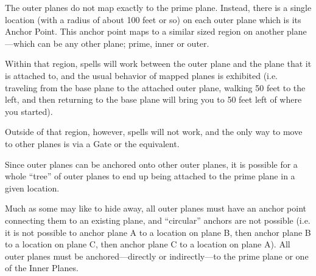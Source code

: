 \begin{multicols*}{2}
The outer planes do not map exactly to the prime plane. Instead, there is a single location (with a radius of about 100 feet or so) on each outer plane which is its Anchor Point. This anchor point maps to a similar sized region on another plane—which can be any other plane; prime, inner or outer.

Within that region,  spells will work between the outer plane and the plane that it is attached to, and the usual behavior of mapped planes is exhibited (i.e. traveling from the base plane to the attached outer plane, walking 50 feet to the left, and then returning to the base plane will bring you to 50 feet left of where you started).

Outside of that region, however,  spells will not work, and the only way to move to other planes is via a Gate or the equivalent.

Since outer planes can be anchored onto other outer planes, it is possible for a whole “tree” of outer planes to end up being attached to the prime plane in a given location.


Much as some  may like to hide away, all outer planes must have an anchor point connecting them to an existing plane, and “circular” anchors are not possible (i.e. it is not possible to anchor plane A to a location on plane B, then anchor plane B to a location on plane C, then anchor plane C to a location on plane A). All outer planes must be anchored—directly or indirectly—to the prime plane or one of the Inner Planes.


\end{multicols*}
